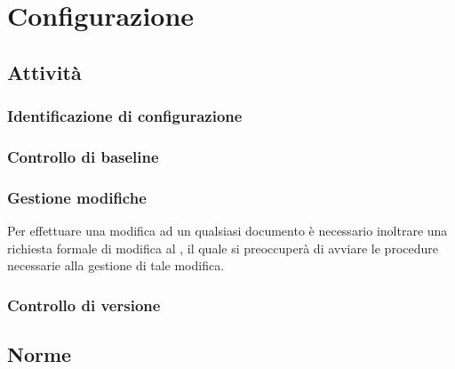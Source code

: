\section{Configurazione}
	\subsection{Attività}
		\subsubsection{Identificazione di configurazione}
		\subsubsection{Controllo di baseline}
		\subsubsection{Gestione modifiche}
		Per effettuare una modifica ad un qualsiasi documento è necessario inoltrare una richiesta formale di modifica al , il quale si preoccuperà di avviare le procedure necessarie alla gestione di tale modifica.
		\subsubsection{Controllo di versione}
	
	\subsection{Norme}
